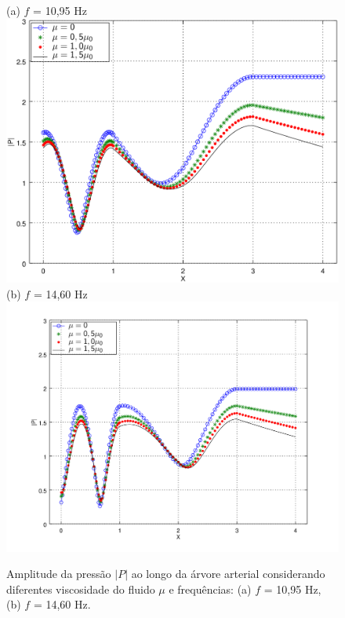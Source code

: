\begin{figure}[!htbp]
	\centering
	(a) $f$ = 10,95 Hz\\
	\includegraphics[scale=0.7]{Figures/fig3_P_f10_95_visc_NEW.png}\\
	(b) $f$ = 14,60 Hz\\
	\includegraphics[scale=0.7]{Figures/fig3_P_f14_60_visc_NEW.png}\\
	\caption{Amplitude da pressão $|P|$ ao longo da árvore arterial considerando diferentes viscosidade do fluido $\mu$ e frequências: (a) $f$ = 10,95 Hz, (b)  $f$ = 14,60 Hz. }
	\label{fig3b:arterial-tree}%
\end{figure}

